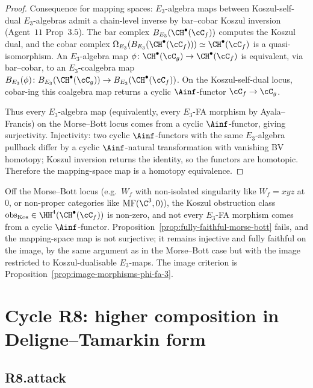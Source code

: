 \begin{proof}
Consequence for mapping spaces: $E_3$-algebra maps between Koszul-self-
dual $E_3$-algebras admit a chain-level inverse by bar--cobar Koszul
inversion (Agent~$11$ Prop~$3.5$).  The bar complex $B_{E_3}(\CH^\bullet(\cC_f))$
computes the Koszul dual, and the cobar complex $\Omega_{E_3}
(B_{E_3}(\CH^\bullet(\cC_f))) \simeq \CH^\bullet(\cC_f)$ is a
quasi-isomorphism.  An $E_3$-algebra map $\phi \colon \CH^\bullet(\cC_g)
\to \CH^\bullet(\cC_f)$ is equivalent, via bar--cobar, to an
$E_3$-coalgebra map $B_{E_3}(\phi) \colon B_{E_3}(\CH^\bullet(\cC_g))
\to B_{E_3}(\CH^\bullet(\cC_f))$.  On the Koszul-self-dual locus,
cobar-ing this coalgebra map returns a cyclic $\Ainf$-functor
$\cC_f \to \cC_g$.

Thus every $E_3$-algebra map (equivalently, every $E_3$-FA morphism by
Ayala--Francis) on the Morse--Bott locus comes from a cyclic
$\Ainf$-functor, giving surjectivity.  Injectivity: two cyclic
$\Ainf$-functors with the same $E_3$-algebra pullback differ by a
cyclic $\Ainf$-natural transformation with vanishing BV homotopy;
Koszul inversion returns the identity, so the functors are homotopic.
Therefore the mapping-space map is a homotopy equivalence.
\end{proof}

\begin{remark}
\label{rem:obstruction-off-morse-bott}
Off the Morse--Bott locus (e.g.\ $W_f$ with non-isolated singularity
like $W_f = xyz$ at $0$, or non-proper categories like
$\mathrm{MF}(\C^3, 0)$), the Koszul obstruction class $\mathrm{obs}_{\mathrm{Kos}}
\in \HH^4(\CH^\bullet(\cC_f))$ is non-zero, and not every $E_3$-FA
morphism comes from a cyclic $\Ainf$-functor.  Proposition~\ref{prop:fully-faithful-morse-bott}
fails, and the mapping-space map is not surjective; it remains
injective and fully faithful on the image, by the same argument as in
the Morse--Bott case but with the image restricted to
Koszul-dualisable $E_3$-maps.  The image criterion is
Proposition~\ref{prop:image-morphisms-phi-fa-3}.
\end{remark}

\section*{Cycle R8: higher composition in Deligne--Tamarkin form}

\subsection*{R8.attack}


